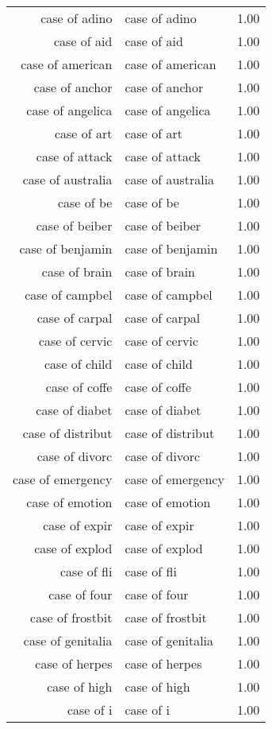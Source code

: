 \begin{table}[ht]
\begin{tabular}{rlr}
  case of adino & case of adino & 1.00 \\ 
  case of aid & case of aid & 1.00 \\ 
  case of american & case of american & 1.00 \\ 
  case of anchor & case of anchor & 1.00 \\ 
  case of angelica & case of angelica & 1.00 \\ 
  case of art & case of art & 1.00 \\ 
  case of attack & case of attack & 1.00 \\ 
  case of australia & case of australia & 1.00 \\ 
  case of be & case of be & 1.00 \\ 
  case of beiber & case of beiber & 1.00 \\ 
  case of benjamin & case of benjamin & 1.00 \\ 
  case of brain & case of brain & 1.00 \\ 
  case of campbel & case of campbel & 1.00 \\ 
  case of carpal & case of carpal & 1.00 \\ 
  case of cervic & case of cervic & 1.00 \\ 
  case of child & case of child & 1.00 \\ 
  case of coffe & case of coffe & 1.00 \\ 
  case of diabet & case of diabet & 1.00 \\ 
  case of distribut & case of distribut & 1.00 \\ 
  case of divorc & case of divorc & 1.00 \\ 
  case of emergency & case of emergency & 1.00 \\ 
  case of emotion & case of emotion & 1.00 \\ 
  case of expir & case of expir & 1.00 \\ 
  case of explod & case of explod & 1.00 \\ 
  case of fli & case of fli & 1.00 \\ 
  case of four & case of four & 1.00 \\ 
  case of frostbit & case of frostbit & 1.00 \\ 
  case of genitalia & case of genitalia & 1.00 \\ 
  case of herpes & case of herpes & 1.00 \\ 
  case of high & case of high & 1.00 \\ 
  case of i & case of i & 1.00 \\ 

\end{tabular}
\end{table}
